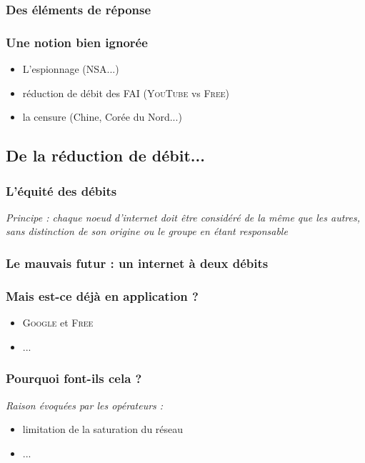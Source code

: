 \begin{frame}\frametitle{Des éléments de réponse}
\end{frame}


\begin{frame}\frametitle{Une notion bien ignorée}
    \begin{itemize}
        \item L'espionnage (\textsc{NSA}...)
        \item réduction de débit des FAI (\textsc{YouTube} vs \textsc{Free})
        \item la censure (Chine, Corée du Nord...)
    \end{itemize}
\end{frame}


\subsection{De la réduction de débit...}
\begin{frame}\frametitle{L'équité des débits}
    \emph{Principe : chaque noeud d'internet doit être considéré de la même
    que les autres, sans distinction de son origine ou le groupe en étant responsable}
\end{frame}


\begin{frame}\frametitle{Le mauvais futur : un internet à deux débits}
\end{frame}


\begin{frame}\frametitle{Mais est-ce déjà en application ?}
    \begin{itemize}
        \item \textsc{Google} et \textsc{Free}
        \item ... %
    \end{itemize}
\end{frame}


\begin{frame}\frametitle{Pourquoi font-ils cela ?}
    \emph{Raison évoquées par les opérateurs :}
    \begin{itemize}
        \item limitation de la saturation du réseau
        \item ... %
    \end{itemize}
\end{frame}


